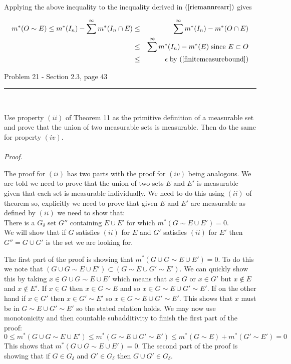 \documentclass[11pt,reqno]{article}
\begin{document}
\noindent Applying the above inequality to the inequality derived in $(\ref{riemannrearr})$ gives

\begin{eqnarray*}
m^*(O \sim E) \le m^*(I_n) -  \sum^\infty m^*(I_n \cap E) &\le& \sum^\infty m^*(I_n) - m^*(O \cap E) \\
&\le& \sum^\infty m^*(I_n) - m^*(E) \; \text{since $E \subset O$} \\
&\le& \epsilon \; \text{by $(\ref{finitemeasurebound})$}
\end{eqnarray*}

\begin{flushleft} 
Problem 21 - Section 2.3, page 43\\
\rule{500pt}{1pt}\\
\end{flushleft} 

Use property $(ii)$ of Theorem 11 as the primitive definition of a measurable set and prove that the union of two measurable sets is measurable. Then do the same for property $(iv)$.
\\\\ \emph{Proof.}

The proof for $(ii)$ has two parts with the proof for $(iv)$ being analogous. We are told we need to prove that the union of two sets $E$ and $E'$ is measurable given that each set is measurable individually. We need to do this using $(ii)$ of theorem so, explicitly we need to prove that given $E$ and $E'$ are measurable as defined by $(ii)$ we need to show that:\\
\indent There is a $G_\delta$ set $G''$ containing $E \cup E'$ for which $m^*(G \sim E \cup E') = 0$. \\

\noindent We will show that if $G$ satisfies $(ii)$ for $E$ and $G'$ satisfies $(ii)$ for $E'$ then $G'' = G \cup G'$ is the set we are looking for.

The first part of the proof is showing that $m^*(G \cup G \sim E \cup E') = 0$. To do this we note that $(G \cup G \sim E \cup E') \subset (G \sim E \cup G' \sim E')$. We can quickly show this by taking $x \in G \cup G \sim E \cup E'$ which means that $x \in G$ or $x \in G'$ but $x \notin E$ and $x \notin E'$. If $x \in G$ then $x \in G \sim E$ and so $x \in G \sim E \cup G' \sim E'$. If on the other hand if $x \in G'$ then $x \in G' \sim E'$ so $x \in G \sim E \cup G' \sim E'$. This shows that $x$ must be in $G \sim E \cup G' \sim E'$ so the stated relation holds.
We may now use monotonicity and then countable subadditivity to finish the first part of the proof:
\[  0 \le m^*(G \cup G \sim E \cup E') \le m^*(G \sim E \cup G' \sim E') \le m^*(G \sim E) + m^*(G' \sim E') = 0  \]
This shows that $m^*(G \cup G \sim E \cup E') = 0$.  The second part of the proof is showing that if $G \in G_\delta$ and $G' \in G_\delta$ then $G \cup G' \in G_\delta$.
\end{document}
